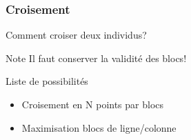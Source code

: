 \begin{frame}
    \frametitle{Croisement}
    Comment croiser deux individus?
    \pause
    \begin{exampleblock}{Note}
        Il faut conserver la validité des blocs!
    \end{exampleblock}
    \pause
    \begin{block}{Liste de possibilités}
        \begin{itemize}
            \pause
            \item Croisement en N points par blocs
            \pause
            \item Maximisation blocs de ligne/colonne
        \end{itemize}
    \end{block}
\end{frame}
